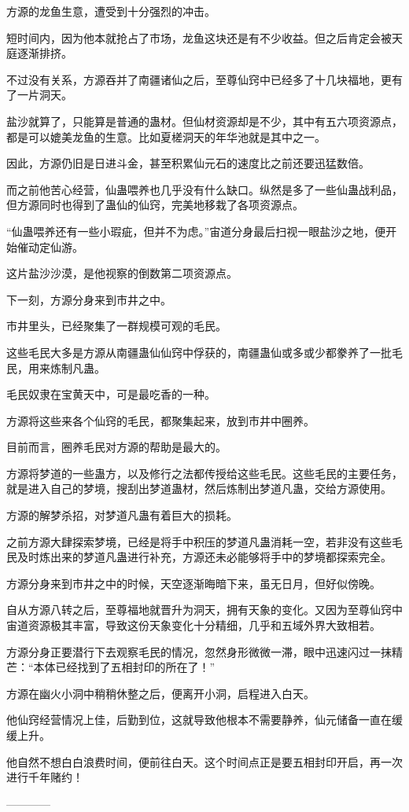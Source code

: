 \begin{this_body}
方源的龙鱼生意，遭受到十分强烈的冲击。

短时间内，因为他本就抢占了市场，龙鱼这块还是有不少收益。但之后肯定会被天庭逐渐排挤。

不过没有关系，方源吞并了南疆诸仙之后，至尊仙窍中已经多了十几块福地，更有了一片洞天。

盐沙就算了，只能算是普通的蛊材。但仙材资源却是不少，其中有五六项资源点，都是可以媲美龙鱼的生意。比如夏槎洞天的年华池就是其中之一。

因此，方源仍旧是日进斗金，甚至积累仙元石的速度比之前还要迅猛数倍。

而之前他苦心经营，仙蛊喂养也几乎没有什么缺口。纵然是多了一些仙蛊战利品，但方源同时也得到了蛊仙的仙窍，完美地移栽了各项资源点。

“仙蛊喂养还有一些小瑕疵，但并不为虑。”宙道分身最后扫视一眼盐沙之地，便开始催动定仙游。

这片盐沙沙漠，是他视察的倒数第二项资源点。

下一刻，方源分身来到市井之中。

市井里头，已经聚集了一群规模可观的毛民。

这些毛民大多是方源从南疆蛊仙仙窍中俘获的，南疆蛊仙或多或少都豢养了一批毛民，用来炼制凡蛊。

毛民奴隶在宝黄天中，可是最吃香的一种。

方源将这些来各个仙窍的毛民，都聚集起来，放到市井中圈养。

目前而言，圈养毛民对方源的帮助是最大的。

方源将梦道的一些蛊方，以及修行之法都传授给这些毛民。这些毛民的主要任务，就是进入自己的梦境，搜刮出梦道蛊材，然后炼制出梦道凡蛊，交给方源使用。

方源的解梦杀招，对梦道凡蛊有着巨大的损耗。

之前方源大肆探索梦境，已经是将手中积压的梦道凡蛊消耗一空，若非没有这些毛民及时炼出来的梦道凡蛊进行补充，方源还未必能够将手中的梦境都探索完全。

方源分身来到市井之中的时候，天空逐渐晦暗下来，虽无日月，但好似傍晚。

自从方源八转之后，至尊福地就晋升为洞天，拥有天象的变化。又因为至尊仙窍中宙道资源极其丰富，导致这份天象变化十分精细，几乎和五域外界大致相若。

方源分身正要潜行下去观察毛民的情况，忽然身形微微一滞，眼中迅速闪过一抹精芒：“本体已经找到了五相封印的所在了！”

方源在幽火小洞中稍稍休整之后，便离开小洞，启程进入白天。

他仙窍经营情况上佳，后勤到位，这就导致他根本不需要静养，仙元储备一直在缓缓上升。

他自然不想白白浪费时间，便前往白天。这个时间点正是要五相封印开启，再一次进行千年赌约！

------------

\end{this_body}

